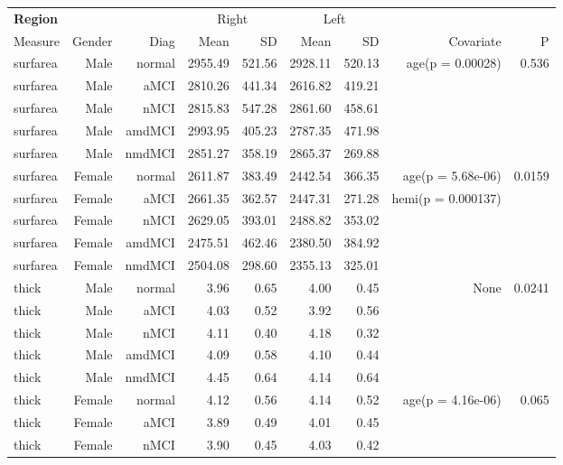 \documentclass[12pt]{article}\usepackage[]{graphicx}\usepackage[]{color}
\newcommand\T{\rule{0pt}{2.6ex}}
\newcommand\B{\rule[-1.2ex]{0pt}{0pt}}
\begin{document}
  \newpage
\begin{sidewaystable}
  \centering
  \footnotesize
	\begin{tabular}{l|rr|rr|rr|rr}
	\hline
	\textbf{Region} & & & \multicolumn{2}{c}{Right} \T & \multicolumn{2}{|c}{Left} & & \\
	\multicolumn{1}{l|}{Measure} \T\B & Gender & Diag & Mean & SD & Mean & SD & Covariate & P \\
	\hline\hline
 surfarea & Male & normal & 2955.49 & 521.56 & 2928.11 & 520.13 & age(p = 0.00028) & 0.536 \\ 
  surfarea & Male & aMCI & 2810.26 & 441.34 & 2616.82 & 419.21 &  &  \\ 
  surfarea & Male & nMCI & 2815.83 & 547.28 & 2861.60 & 458.61 &  &  \\ 
  surfarea & Male & amdMCI & 2993.95 & 405.23 & 2787.35 & 471.98 &  &  \\ 
  surfarea & Male & nmdMCI & 2851.27 & 358.19 & 2865.37 & 269.88 &  &  \\ 
   \hline
surfarea & Female & normal & 2611.87 & 383.49 & 2442.54 & 366.35 & age(p = 5.68e-06) & 0.0159 \\ 
  surfarea & Female & aMCI & 2661.35 & 362.57 & 2447.31 & 271.28 & hemi(p = 0.000137) &  \\ 
  surfarea & Female & nMCI & 2629.05 & 393.01 & 2488.82 & 353.02 &  &  \\ 
  surfarea & Female & amdMCI & 2475.51 & 462.46 & 2380.50 & 384.92 &  &  \\ 
  surfarea & Female & nmdMCI & 2504.08 & 298.60 & 2355.13 & 325.01 &  &  \\ 
   \hline
thick & Male & normal & 3.96 & 0.65 & 4.00 & 0.45 & None & 0.0241 \\ 
  thick & Male & aMCI & 4.03 & 0.52 & 3.92 & 0.56 &  &  \\ 
  thick & Male & nMCI & 4.11 & 0.40 & 4.18 & 0.32 &  &  \\ 
  thick & Male & amdMCI & 4.09 & 0.58 & 4.10 & 0.44 &  &  \\ 
  thick & Male & nmdMCI & 4.45 & 0.64 & 4.14 & 0.64 &  &  \\ 
   \hline
thick & Female & normal & 4.12 & 0.56 & 4.14 & 0.52 & age(p = 4.16e-06) & 0.065 \\ 
  thick & Female & aMCI & 3.89 & 0.49 & 4.01 & 0.45 &  &  \\ 
  thick & Female & nMCI & 3.90 & 0.45 & 4.03 & 0.42 &  &  \\ 

\end{tabular}
\end{sidewaystable}
\end{document}
